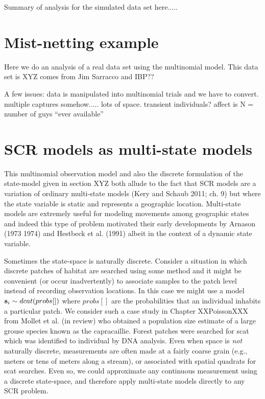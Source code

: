 {Summary of analysis for the simulated data set here.....  



\section{ Mist-netting example}

Here we do an analysis of a real data set using the multinomial model.
This data set is XYZ comes from Jim Sarracco and IBP??

A few issues:
 data is manipulated into multinomial trials and we have to convert.
 multiple captures somehow.....
 lots of space.
 transient individuals?  affect is N = number of guys ``ever available''
 










\section{SCR models as multi-state models}

This multinomial observation model and also the discrete formulation
of the state-model given in section XYZ both allude to the fact that
SCR models are a variation of 
ordinary multi-state models (Kery and Schaub 2011;
ch. 9) but where the state variable is static and represents a
geographic location. Multi-state models are extremely useful for
modeling movements among geographic states and indeed this type of
problem motivated their early developments by Arnason (1973 1974) and
Hestbeck et al. (1991) albeit in the context of a dynamic state
variable.  

Sometimes the state-space is naturally discrete. Consider a
situation in which discrete patches of habitat are searched using some
method and it might be convenient (or occur inadvertently) to
associate samples to the patch level instead of recording observation
locations. In this case we might use a model ${\bf s}_{i} 
\sim dcat(probs[])$
where $probs[]$ are the probabilities that an individual inhabits a
particular patch. We consider such a case study in Chapter
XXPoissonXXX from Mollet et al. (in review) who obtained a population
size estimate of a large grouse species known as the
capracaillie. Forest patches were searched for scat which was
identified to individual by DNA analysis. Even when space is {\it not}
naturally discrete, measurements are often made at a fairly coarse
grain (e.g., meters or tens of meters along a stream), or associated
with spatial quadrats for scat searches. Even so, we could approximate
any continuous measurement using a discrete state-space, and therefore
apply multi-state models directly to any SCR problem.




}
